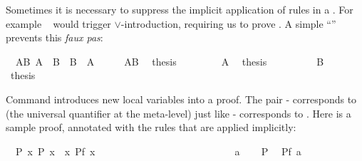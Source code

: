 \begin{isabellebody}
\begin{isamarkuptext}
Sometimes it is necessary to suppress the implicit application of rules in a
. For example ~ would
trigger $\lor$-introduction, requiring us to prove . A simple
``\isa{{\isacharminus}}'' prevents this \emph{faux pas}:%
\end{isamarkuptext}%
\isamarkuptrue%
\ \ AB{\isacharcolon}\ {\isachardoublequote}A\ {\isasymor}\ B{\isachardoublequote}\ \ {\isachardoublequote}B\ {\isasymor}\ A{\isachardoublequote}\isanewline
\isamarkupfalse%
\ {\isacharminus}\isanewline
\ \ \isamarkupfalse%
\ AB\ \isamarkupfalse%
\ {\isacharquery}thesis\isanewline
\ \ \isamarkupfalse%
\isanewline
\ \ \ \ \isamarkupfalse%
\ A\ \isamarkupfalse%
\ {\isacharquery}thesis\ \isamarkupfalse%
\isacommand{{\isachardot}{\isachardot}}\isanewline
\ \ \isamarkupfalse%
\isanewline
\ \ \ \ \isamarkupfalse%
\ B\ \isamarkupfalse%
\ {\isacharquery}thesis\ \isamarkupfalse%
\isacommand{{\isachardot}{\isachardot}}\isanewline
\ \ \isamarkupfalse%
\isanewline
\isamarkupfalse%
\isamarkupfalse%
%
\isamarkuptrue%
%
\begin{isamarkuptext}%
Command  introduces new local variables into a
proof. The pair - corresponds to \isa{{\isasymAnd}}
(the universal quantifier at the
meta-level) just like - corresponds to
\isa{{\isasymLongrightarrow}}. Here is a sample proof, annotated with the rules that are
applied implicitly:%
\end{isamarkuptext}%
\isamarkuptrue%
\ \ P{\isacharcolon}\ {\isachardoublequote}{\isasymforall}x{\isachardot}\ P\ x{\isachardoublequote}\ \ {\isachardoublequote}{\isasymforall}x{\isachardot}\ P{\isacharparenleft}f\ x{\isacharparenright}{\isachardoublequote}\isanewline
\isamarkupfalse%
\ \ \ \ \ \ \ \ \ \ \ \ \ \ \ \ \ \ \ \ \ \ \ %
\isanewline
\ \ \isamarkupfalse%
\ a\isanewline
\ \ \isamarkupfalse%
\ P\ \isamarkupfalse%
\ {\isachardoublequote}P{\isacharparenleft}f\ a{\isacharparenright}{\isachardoublequote}\ \isamarkupfalse%

\end{isabellebody}
